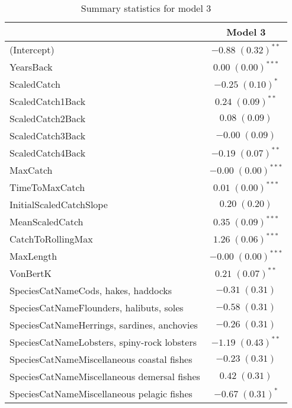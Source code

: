 \documentclass[]{article}
\begin{document}
\begin{table}[h]
\caption{Summary statistics for model 3}
\begin{center}
\begin{tabular}{l c }
\hline
                                            & Model 3 \\
\hline
(Intercept)                                 & $-0.88 \; (0.32)^{**}$  \\
YearsBack                                   & $0.00 \; (0.00)^{***}$  \\
ScaledCatch                                 & $-0.25 \; (0.10)^{*}$   \\
ScaledCatch1Back                            & $0.24 \; (0.09)^{**}$   \\
ScaledCatch2Back                            & $0.08 \; (0.09)$        \\
ScaledCatch3Back                            & $-0.00 \; (0.09)$       \\
ScaledCatch4Back                            & $-0.19 \; (0.07)^{**}$  \\
MaxCatch                                    & $-0.00 \; (0.00)^{***}$ \\
TimeToMaxCatch                              & $0.01 \; (0.00)^{***}$  \\
InitialScaledCatchSlope                     & $0.20 \; (0.20)$        \\
MeanScaledCatch                             & $0.35 \; (0.09)^{***}$  \\
CatchToRollingMax                           & $1.26 \; (0.06)^{***}$  \\
MaxLength                                   & $-0.00 \; (0.00)^{***}$ \\
VonBertK                                    & $0.21 \; (0.07)^{**}$   \\
SpeciesCatNameCods, hakes, haddocks         & $-0.31 \; (0.31)$       \\
SpeciesCatNameFlounders, halibuts, soles    & $-0.58 \; (0.31)$       \\
SpeciesCatNameHerrings, sardines, anchovies & $-0.26 \; (0.31)$       \\
SpeciesCatNameLobsters, spiny-rock lobsters & $-1.19 \; (0.43)^{**}$  \\
SpeciesCatNameMiscellaneous coastal fishes  & $-0.23 \; (0.31)$       \\
SpeciesCatNameMiscellaneous demersal fishes & $0.42 \; (0.31)$        \\
SpeciesCatNameMiscellaneous pelagic fishes  & $-0.67 \; (0.31)^{*}$   \\

\end{tabular}
\end{center}
\end{table}
\end{document}
